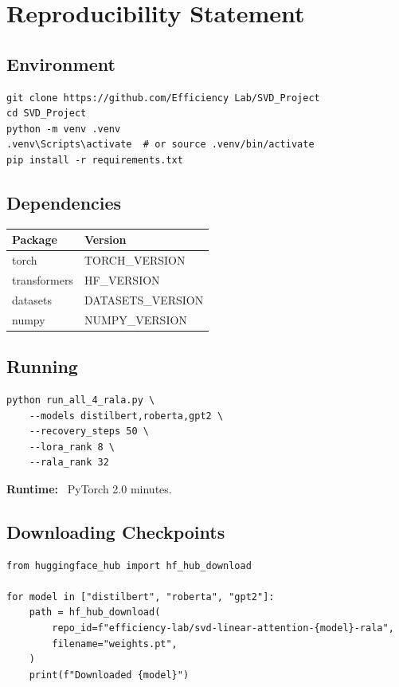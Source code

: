 
\section{Reproducibility Statement}

\subsection{Environment}

\begin{lstlisting}
git clone https://github.com/Efficiency Lab/SVD_Project
cd SVD_Project
python -m venv .venv
.venv\Scripts\activate  # or source .venv/bin/activate
pip install -r requirements.txt
\end{lstlisting}

\subsection{Dependencies}

\begin{table}[H]
\centering
\small
\begin{tabular}{ll}
\toprule
\textbf{Package} & \textbf{Version} \\
\midrule
torch & {{TORCH\_VERSION}} \\
transformers & {{HF\_VERSION}} \\
datasets & {{DATASETS\_VERSION}} \\
numpy & {{NUMPY\_VERSION}} \\
\bottomrule
\end{tabular}
\end{table}

\subsection{Running}

\begin{lstlisting}
python run_all_4_rala.py \
    --models distilbert,roberta,gpt2 \
    --recovery_steps 50 \
    --lora_rank 8 \
    --rala_rank 32
\end{lstlisting}

\textbf{Runtime:} ~PyTorch 2.0 minutes.

\subsection{Downloading Checkpoints}

\begin{lstlisting}
from huggingface_hub import hf_hub_download

for model in ["distilbert", "roberta", "gpt2"]:
    path = hf_hub_download(
        repo_id=f"efficiency-lab/svd-linear-attention-{model}-rala",
        filename="weights.pt",
    )
    print(f"Downloaded {model}")
\end{lstlisting}

